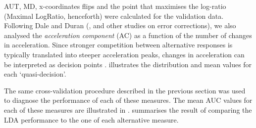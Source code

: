 \documentclass{article}
\newcommand{\addMM}[1]{{\leavevmode\color{red}#1}}
\begin{document}
AUT, MD, x-coordinates flips and the point that maximises the log-ratio (Maximal LogRatio, henceforth) were calculated for the validation data. 
Following Dale and Duran (\citeyear{Dale2011}, and other studies on error corrections), we also analysed the \emph{acceleration component} (AC) as a function of the number of changes in acceleration.
Since stronger competition between alternative responses is typically translated into steeper acceleration peaks, changes in acceleration can be interpreted as decision points \citep{Hehman2014}.   
 illustrates the distribution and mean values for each `quasi-decision'.

The same cross-validation procedure described in the previous section was used to diagnose the performance of each of these measures. The mean AUC values for each of these measures are illustrated in .  summarises the result of comparing the LDA performance to the one of each alternative measure. 
\end{document}
